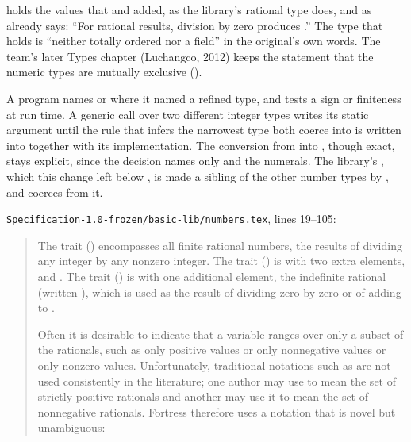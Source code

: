 \begin{description}
 holds the values that  and 
added, as the library's rational type does, and as  already
says: ``For rational results, division by zero produces .''
The type that holds  is ``neither totally ordered nor a field'' in the
original's own words.
The team's later Types chapter (Luchangco, 2012) keeps the statement that the
numeric types are mutually exclusive ().
\item[Effect] A program names  or  where it named a
refined type, and tests a sign or finiteness at run time.
A generic call over two different integer types writes its static
argument until the rule that infers the narrowest type both coerce into is
written into  together with its implementation.
The conversion from  into , though exact,
stays explicit, since the decision names only  and the
numerals.
The library's , which this change left below
, is made a sibling of the other number types by
, and  coerces from it.
\item[Original text] \nolinkurl{Specification-1.0-frozen/basic-lib/numbers.tex},
lines 19--105:
\begin{quote}
The trait  () encompasses all finite rational numbers,
the results of dividing any integer by any nonzero integer.
The trait  () is  with
two extra elements, \EXP{+\infty} and \EXP{-\infty}.
The trait  () is  with
one additional element, the indefinite rational (written ), which is used as the result
of dividing zero by zero or of adding \EXP{-\infty} to \EXP{+\infty}.

Often it is desirable to indicate that a variable ranges over only a subset of
the rationals, such as only positive values or only nonnegative values or only
nonzero values.
Unfortunately, traditional notations such as  are not used consistently
in the literature; one author may use  to mean the set of strictly positive rationals
and another may use it to mean the set of nonnegative rationals.
Fortress therefore uses a notation that is novel but unambiguous:


\end{quote}
\end{description}
